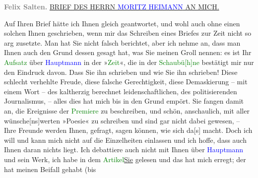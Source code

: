 \pstart
           \raggedleft{}\textcolor{gray}{\textbf{\textbf{Felix Salten.}}}\pend
           {\bigskip}
\pstart
           \noindent{}\centering{}{\pb}\uline{BRIEF DES HERRN \textcolor{blue}{MORITZ
                        HEIMANN}{}\ledrightnote{\textcolor{blue}{Moritz Heimann}} AN MICH.}\pend
           
\pstart
           \noindent{}Auf Ihren Brief hätte ich Ihnen gleich geantwortet, und wohl auch ohne einen solchen
               Ihnen geschrieben, wenn mir das Schreiben eines Briefes zur Zeit nicht so arg
               zusetzte. Man hat Sie nicht falsch berichtet, aber ich nehme an, dass man Ihnen auch
               den Grund dessen gesagt hat, was Sie meinen Groll nennen: es ist Ihr 
               \textcolor{green}{Aufsatz}{}\ledrightnote{{$\rightarrow$}\textcolor{green}{Der Fall Hauptmann}} über \textcolor{blue}{Hauptmann}{}\ledrightnote{\textcolor{blue}{Gerhart Hauptmann}}
                in der »\textcolor{green}{Zeit}{}\ledrightnote{\textcolor{green}{Die Zeit}}«, die \label{K_L03438-8v}\label{K_L03438-8h} in der \textcolor{green}{Schaubü{[}h{]}ne}{}\ledrightnote{\textcolor{green}{Die Schaubühne}} bestätigt mir nur den
               Eindruck davon. Dass Sie ihn schrieben und wie Sie ihn schrieben! Diese schlecht
               verhehlte Freude, diese falsche Gerechtigkeit, diese Demaskierung – mit einem Wort –
               des kaltherzig berechnet leidenschaftlichen, des politisierenden Journalismus, –
               alles dies hat mich bis in den Grund empört. Sie fangen damit an, die Ereignisse der
                  \textcolor{green}{Premiere}{}\ledrightnote{{$\rightarrow$}\textcolor{green}{Die Jungfern vom Bischofsberg. Lustspiel}} zu beschreiben,
               und schön, anschaulich, mit aller wünsche{[}ns{]}werten »Poesie« zu
               schreiben und sind gar nicht dabei gewesen, – Ihre Freunde werden Ihnen, gefragt,
               sagen können, wie sich da{[}s{]} macht. Doch ich will und kann mich
               nicht auf die Einzelheiten einlassen und ich hoffe, dass auch Ihnen daran nichts
               liegt. Ich debattiere auch nicht mit Ihnen über \textcolor{blue}{Hauptmann}{}\ledrightnote{\textcolor{blue}{Gerhart Hauptmann}} und sein Werk, ich habe in dem \textcolor{green}{Artikel}{}\ledrightnote{{$\rightarrow$}\textcolor{green}{Der Fall Hauptmann}}{ }\uline{Sie} gelesen und das hat mich erregt; der \label{K_L03438-9v}\label{K_L03438-9h} hat meinen Beifall gehabt (bis

